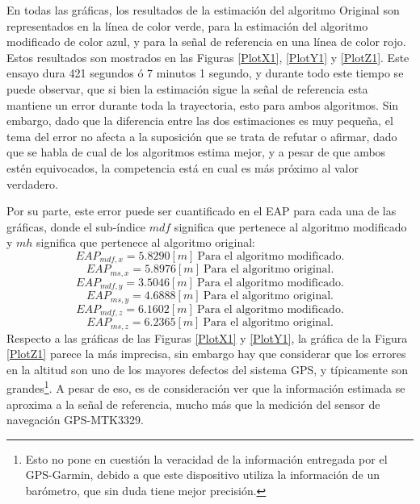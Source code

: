 \documentclass[conference]{IEEEtran}
\begin{document}
En todas las gráficas, los resultados de la estimación del algoritmo Original son representados en la línea de color verde, para la estimación del algoritmo modificado de color azul, y para la señal de referencia en una línea de color rojo. Estos resultados son mostrados en las Figuras \ref{PlotX1}, \ref{PlotY1} y \ref{PlotZ1}. Este ensayo dura 421 segundos ó 7 minutos 1 segundo, y durante todo este tiempo se puede observar, que si bien la estimación sigue la señal de referencia esta mantiene un error durante toda la trayectoria, esto para ambos algoritmos. Sin embargo, dado que la diferencia entre las dos estimaciones es muy pequeña, el tema del error no afecta a la suposición que se trata de refutar o afirmar, dado que se habla de cual de los algoritmos estima mejor, y a pesar de que ambos estén equivocados, la competencia está en cual es más próximo al valor verdadero.\par
Por su parte, este error puede ser cuantificado en el EAP para cada una de las gráficas, donde el sub-índice $mdf$ significa que pertenece al algoritmo modificado y $mh$ significa que pertenece al algoritmo original:
\begin{equation*}
EAP_{mdf,x}=5.8290 [m]~\text{Para el algoritmo modificado.}
\end{equation*}
\begin{equation*}
EAP_{ms,x}=5.8976 [m]~\text{Para el algoritmo original.}
\end{equation*}
\begin{equation*}
EAP_{mdf,y}=3.5046 [m]~\text{Para el algoritmo modificado.}
\end{equation*}
\begin{equation*}
EAP_{ms,y}=4.6888 [m]~\text{Para el algoritmo original.}
\end{equation*}
\begin{equation*}
EAP_{mdf,z}=6.1602 [m]~\text{Para el algoritmo modificado.}
\end{equation*}
\begin{equation*}
EAP_{ms,z}=6.2365 [m]~\text{Para el algoritmo original.}
\end{equation*}
Respecto a las gráficas de las Figuras \ref{PlotX1} y \ref{PlotY1}, la gráfica de la Figura \ref{PlotZ1} parece la más imprecisa, sin embargo hay que considerar que los errores en la altitud son uno de los mayores defectos del sistema GPS, y típicamente son grandes\footnote{Esto no pone en cuestión la veracidad de la información entregada por el GPS-Garmin, debido a que este dispositivo utiliza la información de un barómetro, que sin duda tiene mejor precisión.}. A pesar de eso, es de consideración ver que la información estimada se aproxima a la señal de referencia, mucho más que la medición del sensor de navegación GPS-MTK3329. 
\end{document}
